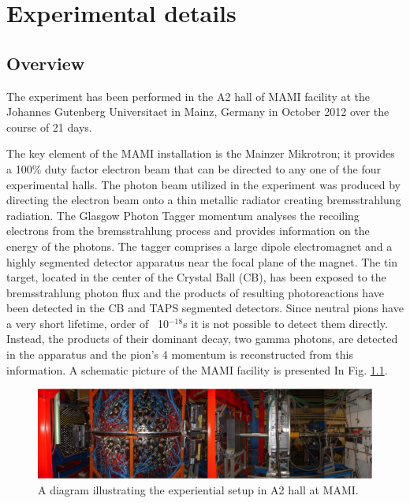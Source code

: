 \setcounter{equation}{0}

\chapter{Experimental details}

\section{Overview}

\indent The experiment has been performed in the A2 hall of MAMI facility at the Johannes Gutenberg Universitaet in Mainz, Germany in October 2012 over the course of 21 days.

\indent The key element of the MAMI installation is the Mainzer Mikrotron; it provides a 100\% duty factor electron beam that can be directed to any one of the four experimental halls. The photon beam utilized in the experiment was produced by directing the electron beam onto a thin metallic radiator creating bremsstrahlung radiation. The Glasgow Photon Tagger momentum analyses the recoiling electrons from the bremsstrahlung process and provides information on the energy of the photons. The tagger comprises a large dipole electromagnet and a highly segmented detector apparatus near the focal plane of the magnet. The tin target, located in the center of the Crystal Ball (CB), has been exposed to the bremsstrahlung photon flux and the products of resulting photoreactions have been detected in the CB and TAPS segmented detectors. Since neutral pions have a very short lifetime, order of ~10$^{-18}$s it is not possible to detect them directly. Instead, the products of their dominant decay, two gamma photons, are detected in the apparatus and the pion's 4 momentum is reconstructed from this information. A schematic picture of the MAMI facility is presented In Fig. \ref{a2hallsetup}.

\begin{figure}[H]
\begin{center}
\includegraphics[scale=0.55]{a2hallsetup.png}
\caption{A diagram illustrating the experiential setup in A2 hall at MAMI.}
\label{a2hallsetup}
\end{center}
\end{figure}

